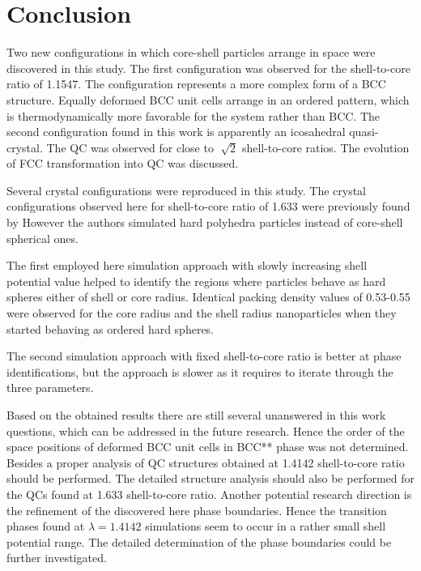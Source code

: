 \section{Conclusion}

Two new configurations in which core-shell particles arrange in space were discovered in this study. The first configuration was observed for the shell-to-core ratio of 1.1547. The configuration represents a more complex form of a BCC structure. Equally deformed BCC unit cells arrange in an ordered pattern, which is thermodynamically more favorable for the system rather than BCC. The second configuration found in this work is apparently an icosahedral quasi-crystal. The QC was observed for close to $\sqrt[]{2}$ shell-to-core ratios. The evolution of FCC transformation into QC was discussed.

Several crystal configurations were reproduced in this study. %
The crystal configurations observed here for shell-to-core ratio of 1.633 were previously found by %
\citet{engelscience} However the authors simulated hard polyhedra particles instead of core-shell spherical ones.

The first employed here simulation approach with slowly increasing shell potential value  helped to identify the regions where particles behave as hard spheres either of shell or core radius. Identical packing density values of 0.53-0.55 were observed for the core radius and the shell radius nanoparticles when they started behaving as ordered hard spheres. %

The second simulation approach with fixed shell-to-core ratio is better at phase identifications, but the approach is slower as it requires to iterate through the three parameters.

Based on the obtained results there are still several unanswered in this work questions, which can be addressed in the future research. Hence the order of the space positions of deformed BCC unit cells in BCC** phase was not determined. Besides a proper analysis of QC structures obtained at 1.4142 shell-to-core ratio should be performed.  %
The detailed structure analysis should also be performed for the QCs found at 1.633 shell-to-core ratio. Another potential research direction is the refinement of the discovered here phase boundaries. Hence the transition phases found at $\lambda=1.4142$ simulations seem to occur in a rather small shell potential range. 
The detailed determination of the phase boundaries could be further investigated.
